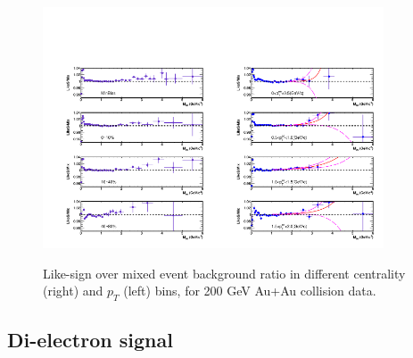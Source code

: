 \begin{figure}
\begin{centering}
\includegraphics[width=0.45\textwidth]{fig/3.Analysis/Run11/LMR_cen}\includegraphics[width=0.45\textwidth]{fig/3.Analysis/Run11/LMR_pT}
\par\end{centering}

\protect\caption{Like-sign over mixed event background ratio in different centrality
(right) and $p_{T}$ (left) bins, for 200 GeV Au+Au collision data.}


\label{fig:LMR cen pT}
\end{figure}



\subsection{Di-electron signal}

